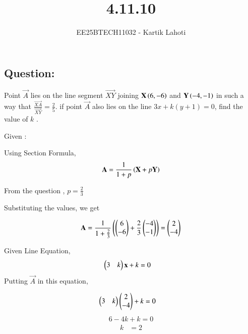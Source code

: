 \documentclass[journal]{IEEEtran}
\numberwithin{equation}{enumi}
\numberwithin{figure}{enumi}
\begin{document}

\vspace{3cm}

\title{4.11.10}
\author{EE25BTECH11032 - Kartik Lahoti}
\maketitle

\subsection*{Question: } 
Point $\vec{A}$ lies on the line segment $\vec{XY}$  joining $\mathbf{X}\left(6,-6\right)$ and $\mathbf{Y}\left(-4,-1\right)$ in such a way that $\frac{\vec{XA}}{\vec{XY}} = \frac{2}{5}$. if point $\vec{A}$ also lies on the line $3x + k(y+1) = 0$, find the value of $k$ .

\solution 

Given : 
\begin{table}[H]
    \centering
    
    \caption*{}
    \label{tab:placeholder_1}
\end{table}


Using Section Formula, 
\begin{align}
    \mathbf{A} = \frac{1}{1+p}\left(\mathbf{X} + p\mathbf{Y}\right)
\end{align}

From the question , $p = \frac{2}{3}$

Substituting the values, we get

\begin{align}
    \mathbf{A} =  \frac{1}{1 + \frac{2}{3}}\left(\begin{pmatrix}6 \\ -6\end{pmatrix} + \frac{2}{3}\begin{pmatrix}-4\\-1\end{pmatrix}\right) = \begin{pmatrix}2 \\ -4\end{pmatrix}
\end{align}

Given Line Equation, 
\begin{align}
    \begin{pmatrix}3 & k\end{pmatrix}\mathbf{x} + k &= 0  
\end{align}
Putting $\vec{A}$ in this equation,

\begin{align}
    \begin{pmatrix}3 & k\end{pmatrix}\begin{pmatrix}2 \\ -4\end{pmatrix} + k &= 0 
\end{align}
\begin{align}
    6 - 4k + k = 0 
\end{align}
\begin{align}
    k &= 2
\end{align}
\end{document}
